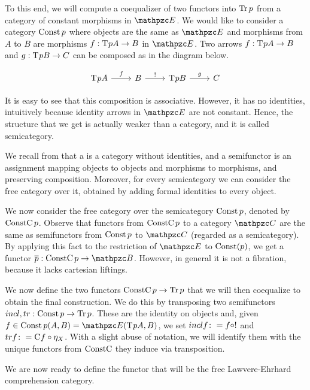 \documentclass{lmcs} %
\theoremstyle{plain}\newtheorem{satz}[thm]{Satz} %
\begin{document}
To this end, we will compute a coequalizer of two functors into $\mathop{\mathrm{Tr}}\nolimits{p}$ from a category of constant morphisms in $\ct{E}$. 
We would like to consider 
a category $\mathop{\mathrm{Const}}\nolimits{p}$ where objects are the same as $\ct{E}$ and 
morphisms from $A$ to $B$ are morphisms $f : \mathrm{T}^{} pA\to B$ in $\ct{E}$. 
Two arrows $f : \mathrm{T}^{}pA\to B$ and $g : \mathrm{T}^{}pB \to C$ can be composed as in  the diagram below.

			\[\begin{tikzcd}
				{\term{}pA} & B & {\term{}pB} & C
				\arrow["f", from=1-1, to=1-2]
				\arrow["{!}", from=1-2, to=1-3]
				\arrow["g", from=1-3, to=1-4]
			\end{tikzcd}\]

It is easy to see that this composition is associative. 
However, it has no identities, intuitively because identity arrows in $\ct{E}$ are not constant. 
Hence, the structure that we get is actually weaker than a category, and it is called semicategory.

We recall from \cite[Sec. ~4]{mitchell1972dominion}
that a  is a category without identities, and a semifunctor is an assignment mapping objects to objects and morphisms to morphisms, and 
preserving composition. 
% 
Moreover, for every semicategory we can consider the free category over it, obtained by adding formal identities to every object. 

We now consider the free category over the semicategory $\mathop{\mathrm{Const}}\nolimits{p}$, denoted by $\mathop{\mathrm{ConstC}}\nolimits{p}$. 
Observe that functors from $\mathop{\mathrm{ConstC}}\nolimits{p}$ to a category $\ct{C}$ are the same as semifunctors from $\mathop{\mathrm{Const}}\nolimits{p}$ to $\ct{C}$ (regarded as a semicategory). 
By applying this fact to the restriction of $\ct{E}$ to $\mathop{\mathrm{Const}}\nolimits(p)$, we get a functor 
$\ConstFib{p}:\ConstCat{p}\to\ct{B}$. 
However, in general it is not a fibration, because it lacks cartesian liftings.

We now define the two functors $\mathop{\mathrm{ConstC}}\nolimits{p}\to\mathop{\mathrm{Tr}}\nolimits{p}$ that we will then coequalize to obtain the final construction. 
We do this by transposing two semifunctors
$incl,tr:\mathop{\mathrm{Const}}\nolimits{p}\to\mathop{\mathrm{Tr}}\nolimits{p}$. 
These are the identity on objects and, 
given $f\in \Hom{\Const{p}}(A,B) = \Hom{\ct{E}}(\term{}pA, B)$, 
 we set $incl f\colon=f\circ !$ and $tr f\colon=\mathrm{C}^{} f\circ \eta_X$. 
With a slight abuse of notation, we will identify them with 
the unique functors from $\mathop{\mathrm{ConstC}}\nolimits$ they induce via transposition. 

We are now ready to define the functor that will be the free Lawvere-Ehrhard comprehension category. 
\end{document}
